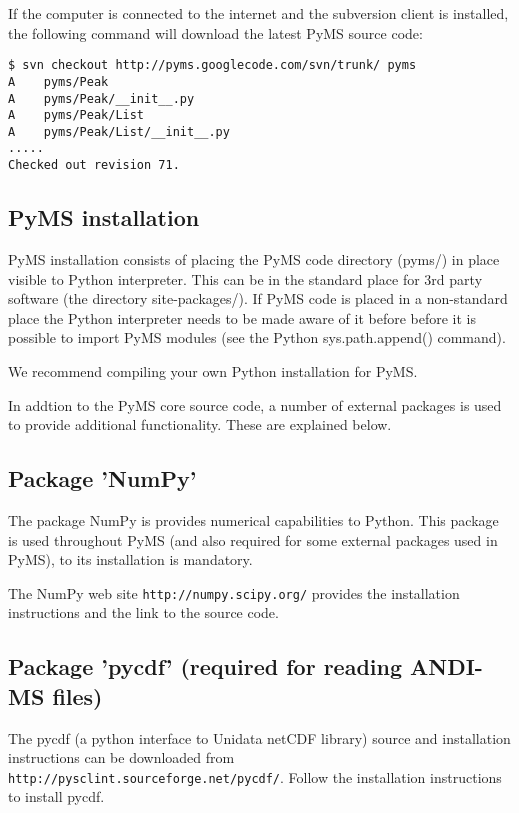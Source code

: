 If the computer is connected to the internet and the subversion client
is installed, the following command will download the latest PyMS source
code:

\begin{verbatim}
$ svn checkout http://pyms.googlecode.com/svn/trunk/ pyms
A    pyms/Peak
A    pyms/Peak/__init__.py
A    pyms/Peak/List
A    pyms/Peak/List/__init__.py
.....
Checked out revision 71.
\end{verbatim}

\subsection{PyMS installation}

PyMS installation consists of placing the PyMS code directory (pyms/) in
place visible to Python interpreter.  This can be in the standard place
for 3rd party software (the directory site-packages/). If PyMS code is
placed in a non-standard place the Python interpreter needs to be made
aware of it before before it is possible to import PyMS modules (see the
Python sys.path.append() command).

We recommend compiling your own Python installation for PyMS.

In addtion to the PyMS core source code, a number of external packages
is used to provide additional functionality. These are explained below.

\subsection{\label{subsec:numpy}Package 'NumPy'}

The package NumPy is provides numerical capabilities to Python. This
package is used throughout PyMS (and also required for some external
packages used in PyMS), to its installation is mandatory. 

The NumPy web site {\tt http://numpy.scipy.org/} provides the installation
instructions and the link to the source code.

\subsection{\label{subsec:pycdf}Package 'pycdf' (required for reading
ANDI-MS files)}

The pycdf (a python interface to Unidata netCDF library) source and
installation instructions can be downloaded from
{\tt http://pysclint.sourceforge.net/pycdf/}. Follow the installation
instructions to install pycdf. 

